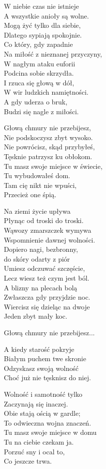 \begin{text}
W niebie czas nie istnieje\\
A wszystkie anioły są wolne.\\
Mogą żyć tylko dla siebie,\\
Dlatego sypiają spokojnie.\\
Co który, gdy zapadnie\\
Na miłość z nieznanej przyczyny,\\
W nagłym ataku euforii\\
Podcina sobie skrzydła.\\
I rzuca się głową w dół,\\
W wir ludzkich namiętności.\\
A gdy uderza o bruk,\\
Budzi się nagle z miłości.

\vin Głową chmury nie przebijesz,\\
\vin Nie podskoczysz zbyt wysoko.\\
\vin Nie powrócisz, skąd przybyłeś,\\
\vin Tęsknie patrzysz ku obłokom.\\
\vin Tu masz swoje miejsce w świecie,\\
\vin Tu wybudowałeś dom.\\
\vin Tam cię nikt nie wpuści,\\
\vin Przecież one śpią.

Na ziemi życie upływa\\
Płynąc od troski do troski.\\
Wąwozy zmarszczek wymywa\\
Wspomnienie dawnej wolności.\\
Dopiero nagi, bezbronny,\\
do skóry odarty z piór\\
Umiesz odczuwać szczęście,\\
Lecz wiesz też czym jest ból.\\
A blizny na plecach bolą\\
Zwłaszcza gdy przyjdzie noc.\\
Wiercisz się dzieląc na dwoje\\
Jeden zbyt mały koc.

\vin Głową chmury nie przebijesz...

A kiedy starość pokryje\\
Białym puchem twe skronie\\
Odzyskasz swoją wolność\\
Choć już nie tęsknisz do niej.

\vin Wolność i samotność tylko\\
\vin Zaczynają się inaczej.\\
\vin Obie stają ością w gardle;\\
\vin To odwieczna wojna znaczeń.\\
\vin Tu masz swoje miejsce w domu\\
\vin Tu na ciebie czekam ja.\\
\vin Porzuć sny i ocal to,\\
\vin Co jeszcze trwa.
\end{text}
